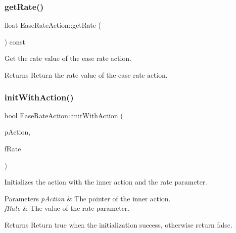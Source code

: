 \subsubsection{\texorpdfstring{get\+Rate()}{getRate()}\hspace{0.1cm}{\footnotesize\ttfamily [2/2]}}
{\footnotesize\ttfamily float Ease\+Rate\+Action\+::get\+Rate (\begin{DoxyParamCaption}{ }\end{DoxyParamCaption}) const\hspace{0.3cm}{\ttfamily [inline]}}



Get the rate value of the ease rate action. 

\begin{DoxyReturn}{Returns}
Return the rate value of the ease rate action. 
\end{DoxyReturn}
\mbox{\label{classEaseRateAction_aab967ce600eedd8b912f6b359a44cd59}} 
\subsubsection{\texorpdfstring{init\+With\+Action()}{initWithAction()}}
{\footnotesize\ttfamily bool Ease\+Rate\+Action\+::init\+With\+Action (\begin{DoxyParamCaption}\item[{\hyperlink{classActionInterval}{Action\+Interval} $\ast$}]{p\+Action,  }\item[{float}]{f\+Rate }\end{DoxyParamCaption})}



Initializes the action with the inner action and the rate parameter. 


\begin{DoxyParams}{Parameters}
{\em p\+Action} & The pointer of the inner action. \\
\hline
{\em f\+Rate} & The value of the rate parameter. \\
\hline
\end{DoxyParams}
\begin{DoxyReturn}{Returns}
Return true when the initialization success, otherwise return false. 
\end{DoxyReturn}
\mbox{\label{classEaseRateAction_acd2b87a3358e01fa74a726634dcd41fb}} 
